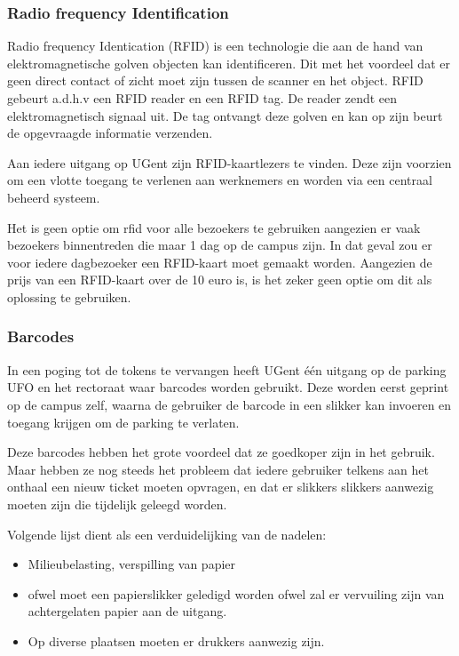 \subsubsection{Radio frequency Identification}

Radio frequency Identication (RFID) is een technologie die aan de hand van elektromagnetische golven objecten kan identificeren. Dit met het voordeel dat er geen direct contact of zicht moet zijn tussen de scanner en het object. RFID gebeurt a.d.h.v een RFID reader en een RFID tag. De reader zendt een elektromagnetisch signaal uit. De tag ontvangt deze golven en kan op zijn beurt de opgevraagde informatie verzenden. \autocite{li2009design}

Aan iedere uitgang op UGent zijn RFID-kaartlezers te vinden. Deze zijn voorzien om een vlotte toegang te verlenen aan werknemers en worden via een centraal beheerd systeem.

Het is geen optie om rfid voor alle bezoekers te gebruiken aangezien er vaak bezoekers binnentreden die maar 1 dag op de campus zijn. In dat geval zou er voor iedere dagbezoeker een RFID-kaart moet gemaakt worden. Aangezien de prijs van een RFID-kaart over de 10 euro is, is het zeker geen optie om dit als oplossing te gebruiken.

\subsubsection{Barcodes}
In een poging tot de tokens te vervangen heeft UGent één uitgang op de parking UFO en het rectoraat waar barcodes worden gebruikt. Deze worden eerst geprint op de campus zelf, waarna de gebruiker de barcode in een slikker kan invoeren en toegang krijgen om de parking te verlaten.

Deze barcodes hebben het grote voordeel dat ze goedkoper zijn in het gebruik. Maar hebben ze nog steeds het probleem dat iedere gebruiker telkens aan het onthaal een nieuw ticket moeten opvragen, en dat er slikkers slikkers aanwezig moeten zijn die tijdelijk geleegd worden.

Volgende lijst dient als een verduidelijking van de nadelen:
\begin{itemize}
	\item Milieubelasting, verspilling van papier
	\item ofwel moet een papierslikker geledigd worden ofwel zal er vervuiling zijn van achtergelaten papier aan de uitgang.
	\item Op diverse plaatsen moeten er drukkers aanwezig zijn.
\end{itemize}



